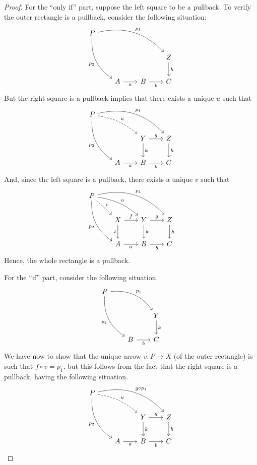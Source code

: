 \begin{proof}
    For the ``only if'' part, suppose the left square to be a pullback. To verify the outer rectangle is a pullback, consider the following situation:
    \[
        \begin{tikzcd}[row sep = 20, column sep = 20]
            P \arrow[bend left=30]{rrrd}{p_1} \arrow[bend right=30, swap]{ddr}{p_2} & & \\
            & & & Z \arrow[d, "h"] \\
            & A \arrow[r, "a"swap] & B \arrow[r, "b"swap] & C
        \end{tikzcd}
    \]
    But the right square is a pullback implies that there exists a unique $u$ such that
    \[
        \begin{tikzcd}[row sep = 20, column sep = 20]
            P \arrow[bend left=30]{rrrd}{p_1} \arrow[bend right=30, swap]{ddr}{p_2} \arrow[bend left=15, dashed]{drr}{u}& & \\
            & &  Y \arrow[r, "g"] \arrow[d, "k"]& Z \arrow[d, "h"] \\
            & A \arrow[r, "a"swap] & B \arrow[r, "b"swap] & C
        \end{tikzcd}
    \]
    And, since the left square is a pullback, there exists a unique $v$ such that
    \[
        \begin{tikzcd}[row sep = 20, column sep = 20]
            P \arrow[bend left=30]{rrrd}{p_1} \arrow[bend right=30, swap]{ddr}{p_2} \arrow[bend left=15]{drr}{u} \arrow[dr, "v", dashed]& & \\
            & X \arrow[r, "f"] \arrow[d, "t"swap] &  Y \arrow[r, "g"] \arrow[d, "k"]& Z \arrow[d, "h"] \\
            & A \arrow[r, "a"swap] & B \arrow[r, "b"swap] & C
        \end{tikzcd}
    \]
    Hence, the whole rectangle is a pullback.

    For the ``if'' part, consider the following situation.
    \[
        \begin{tikzcd}[row sep = 20, column sep = 20]
            P \arrow[bend left=30]{rrd}{p_1} \arrow[bend right=30, swap]{ddr}{p_2} & \\
            & & Y \arrow[d, "k"] \\
            & B \arrow[r, "b"swap] & C
        \end{tikzcd}
    \]
    We have now to show that the unique arrow $v: P \to X$ (of the outer rectangle) is such that $f \circ v = p_1$, but this follows from the fact that the right square is a pullback, having the following situation.
    \[
        \begin{tikzcd}[row sep = 20, column sep = 20]
            P \arrow[bend left=30]{rrrd}{g \circ p_1} \arrow[bend right=30, swap]{ddr}{p_2} \arrow[bend left=15, dashed]{drr}{u}& & \\
            & &  Y \arrow[r, "g"] \arrow[d, "k"]& Z \arrow[d, "h"] \\
            & A \arrow[r, "a"swap] & B \arrow[r, "b"swap] & C
        \end{tikzcd}
    \]
\end{proof}    

